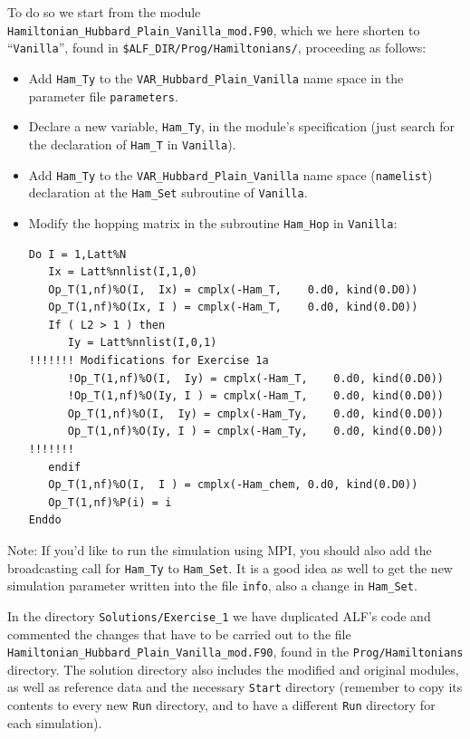 \documentclass[10pt,modern]{scrartcl}
\numberwithin{exerciseitem}{exercise} %
\begin{document}
To do so we start from the module \texttt{Hamiltonian\_Hubbard\_Plain\_Vanilla\_mod.F90}, which we here shorten to ``\texttt{Vanilla}'', found in \texttt{\$ALF\_DIR/Prog/Hamiltonians/}, proceeding as follows: 
\begin{itemize}
	\item Add \texttt{Ham\_Ty} to the \texttt{VAR\_Hubbard\_Plain\_Vanilla} name space in the parameter file \texttt{parameters}.
	\item Declare a new variable, \texttt{Ham\_Ty}, in the module's specification (just search for the declaration of \texttt{Ham\_T} in \texttt{Vanilla}).
	\item Add \texttt{Ham\_Ty} to the \texttt{VAR\_Hubbard\_Plain\_Vanilla} name space (\texttt{namelist}) declaration at the \texttt{Ham\_Set} subroutine of \texttt{Vanilla}.
	\item Modify the hopping matrix in the subroutine \texttt{Ham\_Hop} in \texttt{Vanilla}:
\begin{lstlisting}[style=fortran]
Do I = 1,Latt%N
   Ix = Latt%nnlist(I,1,0)
   Op_T(1,nf)%O(I,  Ix) = cmplx(-Ham_T,    0.d0, kind(0.D0))
   Op_T(1,nf)%O(Ix, I ) = cmplx(-Ham_T,    0.d0, kind(0.D0))
   If ( L2 > 1 ) then
      Iy = Latt%nnlist(I,0,1)
!!!!!!! Modifications for Exercise 1a
      !Op_T(1,nf)%O(I,  Iy) = cmplx(-Ham_T,    0.d0, kind(0.D0))
      !Op_T(1,nf)%O(Iy, I ) = cmplx(-Ham_T,    0.d0, kind(0.D0))
      Op_T(1,nf)%O(I,  Iy) = cmplx(-Ham_Ty,    0.d0, kind(0.D0))
      Op_T(1,nf)%O(Iy, I ) = cmplx(-Ham_Ty,    0.d0, kind(0.D0))
!!!!!!!
   endif
   Op_T(1,nf)%O(I,  I ) = cmplx(-Ham_chem, 0.d0, kind(0.D0))
   Op_T(1,nf)%P(i) = i 
Enddo
\end{lstlisting} 
\end{itemize}
Note: If you'd like to run the simulation using MPI, you should also add the broadcasting call for \texttt{Ham\_Ty} to \texttt{Ham\_Set}. It is a good idea as well to get the new simulation parameter written into the file \texttt{info}, also a change in \texttt{Ham\_Set}.

In the directory \texttt{Solutions/Exercise\_1} we have duplicated ALF's code and commented the changes that have to be carried out to the file \texttt{Hamiltonian\_Hubbard\_Plain\_Vanilla\_mod.F90}, found in the \texttt{Prog/Hamiltonians} directory. The solution directory also includes the modified and original modules, as well as reference data and the necessary \texttt{Start} directory (remember to copy its contents to every new \texttt{Run} directory, and to have a different \texttt{Run} directory for each simulation).
\end{document}
